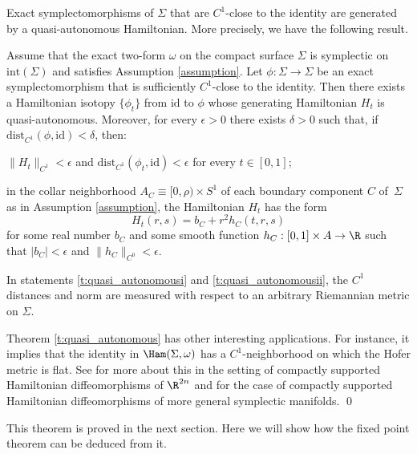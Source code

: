 Exact symplectomorphisms of $\Sigma$ that are $C^1$-close to the identity are generated by a quasi-autonomous Hamiltonian. More precisely, we have the following result.

\begin{thm}
\label{t:quasi_autonomous}
Assume that the exact two-form $\omega$ on the compact surface $\Sigma$ is symplectic on $\mathrm{int}(\Sigma)$ and satisfies Assumption \ref{assumption}. Let $\phi:\Sigma\to\Sigma$ be an exact symplectomorphism that is sufficiently $C^1$-close to the identity. Then there exists a Hamiltonian isotopy $\{\phi_t\}$ from $\mathrm{id}$ to $\phi$ whose generating Hamiltonian $H_t$ is quasi-autonomous.
Moreover, for every $\epsilon>0$ there exists $\delta>0$ such that, if $\mathrm{dist}_{C^1}(\phi,\mathrm{id})<\delta$, then:
\begin{enumeratei}
\item\label{t:quasi_autonomousi}
$\|H_t\|_{C^1}<\epsilon$ and $\mathrm{dist}_{C^1}(\phi_t,\mathrm{id})<\epsilon$ for every $t\in [0,1]$;
\item\label{t:quasi_autonomousii}
in the collar neighborhood $A_C\equiv [0,\rho)\times S^1$ of each boundary component $C$ of~$\Sigma$ as in Assumption \ref{assumption}, the Hamiltonian $H_t$ has the form
\[
H_t(r,s) = b_C + r^2 h_C(t,r,s)
\]
for some real number $b_C$ and some smooth function $h_C: [0,1] \times A \to \R$ such that $|b_C|<\epsilon$ and $\|h_C\|_{C^0} < \epsilon$.
\end{enumeratei}
\end{thm}

In statements \eqref{t:quasi_autonomousi} and \eqref{t:quasi_autonomousii}, the $C^1$ distances and norm are measured with respect to an arbitrary Riemannian metric on $\Sigma$.

\begin{rem}
Theorem \ref{t:quasi_autonomous} has other interesting applications. For instance, it implies that the identity in $\Ham(\Sigma,\omega)$ has a $C^1$-neighborhood on which the Hofer metric is flat. See \cite{Bialy:1994} for more about this in the setting of compactly supported Hamiltonian diffeomorphisms of $\R^{2n}$ and \cite{Lalonde:1995} for the case of compactly supported Hamiltonian diffeomorphisms of more general symplectic manifolds.
\hfill\qed
\end{rem}

This theorem is proved in the next section. Here we will show how the fixed point theorem can be deduced from it.

